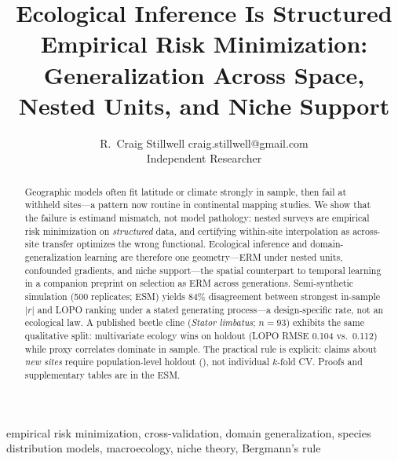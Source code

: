 \documentclass[11pt]{article}
\begin{document}
\title{Ecological Inference Is Structured Empirical Risk Minimization:\\
       Generalization Across Space, Nested Units, and Niche Support}

\author{\name R.\ Craig Stillwell \email craig.stillwell@gmail.com \\
        \addr Independent Researcher}


\maketitle

\begin{abstract}%
Geographic models often fit latitude or climate strongly in sample, then
fail at withheld sites---a pattern now routine in continental mapping
studies.  We show that the failure is estimand mismatch, not
model pathology: nested surveys are empirical risk minimization on
\emph{structured} data, and certifying within-site interpolation as
across-site transfer optimizes the wrong functional.  Ecological inference
and domain-generalization learning are therefore one geometry---ERM under
nested units, confounded gradients, and niche support---the spatial
counterpart to temporal learning in a companion preprint on selection as
ERM across generations.  Semi-synthetic simulation (500 replicates; ESM)
yields 84\% disagreement between strongest in-sample $|r|$ and LOPO ranking
under a stated generating process---a design-specific rate, not an
ecological law.  A published beetle cline (\emph{Stator limbatus};
$n=93$) exhibits the same qualitative split: multivariate ecology wins on
holdout (LOPO RMSE 0.104 vs.\ 0.112) while proxy correlates dominate in
sample.  The practical rule is explicit: claims about \emph{new sites}
require population-level holdout (\Etwo), not individual $k$-fold CV.
Proofs and supplementary tables are in the ESM.
\end{abstract}

\begin{keywords}
  empirical risk minimization, cross-validation, domain generalization,
  species distribution models, macroecology, niche theory, Bergmann's rule
\end{keywords}

\end{document}
